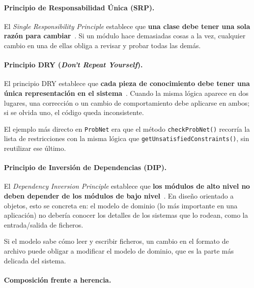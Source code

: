 \documentclass[11pt,a4paper]{article}
\newcommand{\code}[1]{\texttt{#1}}
\begin{document}
\paragraph{Principio de Responsabilidad Única (SRP).}

El \emph{Single Responsibility Principle} establece que \textbf{una
clase debe tener una sola razón para cambiar}~\cite{martin2003}.  Si
un módulo hace demasiadas cosas a la vez, cualquier cambio en una de
ellas obliga a revisar y probar todas las demás.
\label{sec:fund-dry}
\paragraph{Principio DRY (\emph{Don't Repeat Yourself}).}

El principio DRY establece que \textbf{cada pieza de conocimiento debe
tener una única representación en el sistema}~\cite{hunt1999}.  Cuando
la misma lógica aparece en dos lugares, una corrección o un cambio de
comportamiento debe aplicarse en ambos; si se olvida uno, el código queda
inconsistente.

El ejemplo más directo en \code{ProbNet} era que el método
\code{checkProbNet()} recorría la lista de restricciones con la misma
lógica que \code{getUnsatisfiedConstraints()}, sin reutilizar ese último.

\label{sec:fund-dip}
\paragraph{Principio de Inversión de Dependencias (DIP).}

El \emph{Dependency Inversion Principle} establece que \textbf{los
módulos de alto nivel no deben depender de los módulos de bajo
nivel}~\cite{martin2003}.  En diseño orientado a objetos, esto se
concreta en: el modelo de dominio (lo más importante en una aplicación)
no debería conocer los detalles de los sistemas que lo rodean, como la
entrada/salida de ficheros.

Si el modelo sabe cómo leer y escribir ficheros, un cambio en el formato
de archivo puede obligar a modificar el modelo de dominio, que es la parte
más delicada del sistema.

\label{sec:fund-composition}
\paragraph{Composición frente a herencia.}
\end{document}
